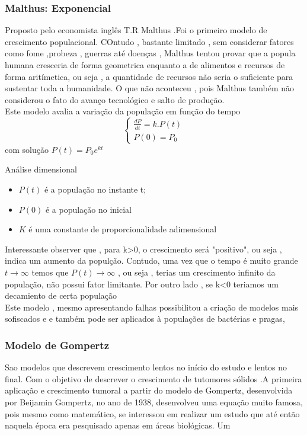 \subsubsection*{ Malthus: Exponencial}
Proposto pelo economista inglês T.R Malthus .Foi o primeiro modelo de crescimento populacional. COntudo , bastante limitado , sem considerar fatores como fome ,probeza , guerras até doenças , Malthus tentou provar que a popula humana cresceria de forma geometrica enquanto a de alimentos e recursos de forma aritímetica, ou seja , a quantidade de recursos não seria o suficiente para sustentar toda a humanidade. O que não  aconteceu , pois Malthus também não considerou o fato do avanço tecnológico  e salto de produção.\\
Este modelo avalia a variação da população em função do tempo 
     \begin{equation}
\begin{cases}
  \frac{dP}{dt} =k.P(t)\\
   P(0)=P_0  
\end{cases}
\end{equation}
com solução $P(t)=P_0e^{kt}$

Análise dimensional
\begin{itemize}
    \item $P(t)$ é a população no instante t;
    \item $P(0)$ é a população no inicial
    \item $K$ é uma constante de proporcionalidade adimensional 
\end{itemize}

Interessante observer que , para k>0, o crescimento será "positivo", ou seja , indica um aumento da populção. Contudo, uma vez que o tempo é muito grande $t \to\infty $ temos que $P(t) \to \infty$ , ou seja , terias um crescimento infinito da população, não possui fator limitante. Por outro lado , se k<0 teriamos um decamiento de certa população 
\\
 Este modelo , mesmo apresentando falhas possibilitou a criação de modelos mais sofiscados e e também pode ser aplicados à populações de bactérias e pragas, 

\subsubsection*{ Modelo de Gompertz}

Sao modelos que descrevem crescimento lentos no início do estudo e lentos no final. Com o objetivo de descrever o crescimento de tutomores sólidos .A primeira aplicação e crescimento tumoral a partir do modelo de Gompertz, desenvolvida por Beijamin Gompertz, no ano de 1938, desenvolveu uma equação muito famosa, pois mesmo como matemático, se interessou em realizar um estudo que até então naquela época era pesquisado apenas em áreas biológicas. Um 

